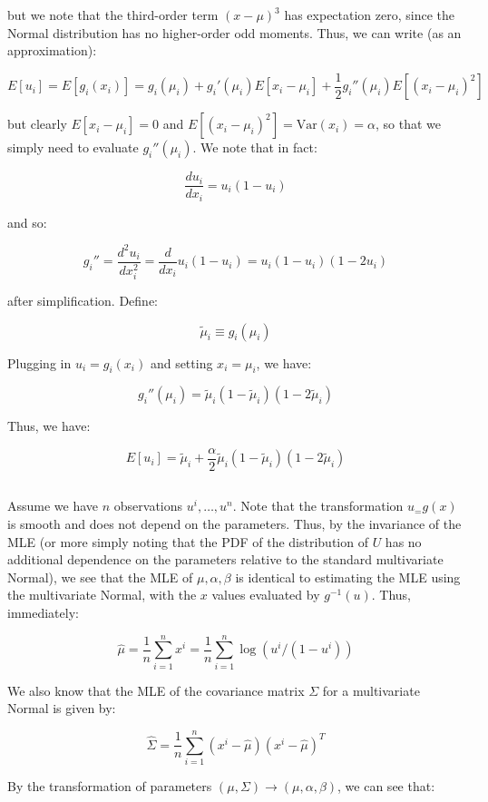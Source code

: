 \documentclass[psamsfonts]{amsart}
\theoremstyle{definition}
\theoremstyle{remark}
\numberwithin{equation}{section}
\begin{document}
but we note that the third-order term $(x-\mu)^3$ has expectation zero, since the Normal distribution has no higher-order odd moments. Thus, we can write (as an approximation):

$$E[u_i] = E[g_i(x_i)] = g_i(\mu_i) + g_i'(\mu_i) E[x_i-\mu_i] + \frac{1}{2}g_i''(\mu_i) E[(x_i-\mu_i)^2]$$

but clearly $E[x_i-\mu_i] = 0$ and $E[(x_i-\mu_i)^2] = \text{Var}(x_i) = \alpha$, so that we simply need to evaluate $g_i''(\mu_i)$. We note that in fact:

$$\frac{d u_i}{d x_i} = u_i (1-u_i)$$

and so:

$$g_i'' = \frac{d^2u_i}{dx_i^2} = \frac{d}{dx_i} u_i(1-u_i) = u_i(1-u_i)(1-2u_i)$$

after simplification. Define:

$$\tilde{\mu}_i \equiv g_i(\mu_i)$$

Plugging in $u_i = g_i(x_i)$ and setting $x_i = \mu_i$, we have:

$$g_i''(\mu_i) = \tilde{\mu}_i(1-\tilde{\mu}_i)(1-2\tilde{\mu}_i)$$

Thus, we have:

$$E[u_i] = \tilde{\mu}_i + \frac{\alpha}{2}\tilde{\mu}_i(1-\tilde{\mu}_i)(1-2\tilde{\mu}_i)$$



\subsection{} Assume we have $n$ observations $u^i, \dots, u^n$. Note that the transformation $u_ = g(x)$ is smooth and does not depend on the parameters. Thus, by the invariance of the MLE (or more simply noting that the PDF of the distribution of $U$ has no additional dependence on the parameters relative to the standard multivariate Normal), we see that the MLE of $\mu, \alpha, \beta$ is identical to estimating the MLE using the multivariate Normal, with the $x$ values evaluated by $g^{-1}(u)$. Thus, immediately:

$$\hat{\mu} = \frac{1}{n} \sum_{i=1}^n x^i = \frac{1}{n} \sum_{i=1}^n \log(u^i/(1-u^i))$$

We also know that the MLE of the covariance matrix $\Sigma$ for a multivariate Normal is given by:

$$\hat{\Sigma} = \frac{1}{n}\sum_{i=1}^n (x^i-\hat{\mu})(x^i-\hat{\mu})^T$$

By the transformation of parameters $(\mu, \Sigma) \rightarrow (\mu, \alpha, \beta)$, we can see that:
\end{document}
